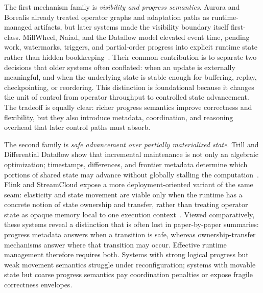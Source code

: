 \documentclass[acmsmall,screen,review]{acmart}
\begin{document}
The first mechanism family is 
\emph{visibility and progress semantics}. Aurora and Borealis already treated operator graphs and adaptation paths as runtime-managed artifacts, but later systems made the visibility boundary itself first-class. MillWheel, Naiad, and the Dataflow model elevated event time, pending work, watermarks, triggers, and partial-order progress into explicit runtime state rather than hidden bookkeeping~\cite{abadi2003aurora,abadi2005borealis,akidau2013millwheel,murray2013naiad,akidau2015dataflow}. Their common contribution is to separate two decisions that older systems often conflated: when an update is externally meaningful, and when the underlying state is stable enough for buffering, replay, checkpointing, or reordering. This distinction is foundational because it changes the unit of control from operator throughput to controlled state advancement. The tradeoff is equally clear: richer progress semantics improve correctness and flexibility, but they also introduce metadata, coordination, and reasoning overhead that later control paths must absorb.

The second family is 
\emph{safe advancement over partially materialized state}. Trill and Differential Dataflow show that incremental maintenance is not only an algebraic optimization; timestamps, differences, and frontier metadata determine which portions of shared state may advance without globally stalling the computation~\cite{chandramouli2014trill,murray2013differential}. Flink and StreamCloud expose a more deployment-oriented variant of the same seam: elasticity and state movement are viable only when the runtime has a concrete notion of state ownership and transfer, rather than treating operator state as opaque memory local to one execution context~\cite{carbone2015flink,gulisano2012streamcloud}. Viewed comparatively, these systems reveal a distinction that is often lost in paper-by-paper summaries: progress metadata answers when a transition is safe, whereas ownership-transfer mechanisms answer where that transition may occur. Effective runtime management therefore requires both. Systems with strong logical progress but weak movement semantics struggle under reconfiguration; systems with movable state but coarse progress semantics pay coordination penalties or expose fragile correctness envelopes.
\end{document}
